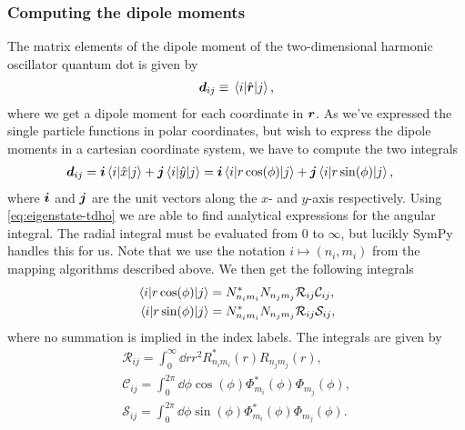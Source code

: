         \subsubsection{Computing the dipole moments}
            The matrix elements of the dipole moment of the two-dimensional
            harmonic oscillator quantum dot is given by
            \begin{align}
                \boldsymbol{d}_{ij}
                \equiv \mel{i}{\hat{\boldsymbol{r}}}{j},
            \end{align}
            where we get a dipole moment for each coordinate in $\boldsymbol{r}$. As
            we've expressed the single particle functions in polar coordinates,
            but wish to express the dipole moments in a cartesian coordinate
            system, we have to compute the two integrals
            \begin{align}
                \vf{d}_{ij}
                &= \vf{i}\mel{i}{\position}{j}
                + \vf{j}\mel{i}{\position[y]}{j}
                = \vf{i}\mel{i}{r \cos(\phi)}{j}
                + \vf{j}\mel{i}{r \sin(\phi)}{j},
                \label{eq:dipole_elements}
            \end{align}
            where $\boldsymbol{i}$ and $\boldsymbol{j}$ are the unit vectors along the $x$- and
            $y$-axis respectively.
            Using \autoref{eq:eigenstate-tdho} we are able to find analytical
            expressions for the angular integral.
            The radial integral must be evaluated from $0$ to $\infty$, but
            lucikly SymPy \cite{sympy} handles this for us.
            Note that we use the notation $i \mapsto (n_i, m_i)$ from the
            mapping algorithms described above. We then get the following
            integrals
            \begin{align}
                \mel{i}{r \cos(\phi)}{j}
                &= N^{*}_{n_i m_i} N_{n_j m_j}
                \mathcal{R}_{ij}
                \mathcal{C}_{ij},
                \\
                \mel{i}{r \sin(\phi)}{j}
                &= N^{*}_{n_i m_i} N_{n_j m_j}
                \mathcal{R}_{ij}
                \mathcal{S}_{ij},
            \end{align}
            where no summation is implied in the index labels.
            The integrals are given by
            \begin{gather}
                \mathcal{R}_{ij}
                =
                \int_{0}^{\infty} \dd r r^2
                R_{n_i m_i}^{*}(r) R_{n_j m_j}(r),
                \label{eq:radial-integral-tdho}
                \\
                \mathcal{C}_{ij}
                =
                \int_{0}^{2\pi}
                \dd \phi
                \cos(\phi)
                \Phi_{m_i}^{*}(\phi)
                \Phi_{m_j}(\phi),
                \label{eq:cos-integral-tdho}
                \\
                \mathcal{S}_{ij}
                =
                \int_{0}^{2\pi}
                \dd \phi
                \sin(\phi)
                \Phi_{m_i}^{*}(\phi)
                \Phi_{m_j}(\phi).
                \label{eq:sin-integral-tdho}
            \end{gather}
